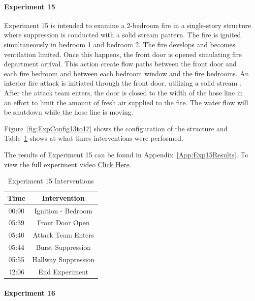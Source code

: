 \documentclass[12pt,oneside]{book}
\begin{document}
\clearpage

\paragraph{Experiment 15} \mbox{}

Experiment 15 is intended to examine a 2-bedroom fire in a single-story structure where suppression is conducted with a solid stream pattern. The fire is ignited simultaneously in bedroom 1 and bedroom 2. The fire develops and becomes ventilation limited. Once this happens, the front door is opened simulating fire department arrival. This action create flow paths between the front door and each fire bedroom and between each bedroom window and the fire bedrooms. An interior fire attack is initiated through the front door, utilizing a solid stream . After the attack team enters, the door is closed to the width of the hose line in an effort to limit the amount of fresh air supplied to the fire. The water flow will be shutdown while the hose line is moving.

Figure~\ref{fig:ExpConfig13to17} shows the configuration of the structure and Table~\ref{Table:Exp15Interventions} shows at what times interventions were performed. 

The results of Experiment 15 can be found in Appendix~\ref{App:Exp15Results}. To view the full experiment video \href{https://youtu.be/gl8rc1Nsl1k}{Click Here}.

\begin{table}[H]
	\centering
	\caption{Experiment 15 Interventions}
	\begin{tabular}{|c|c|} 
		\hline
		Time & Intervention \\ \hline \hline
		00:00 & Ignition - Bedroom \\ \hline
		05:39 & Front Door Open \\ \hline
		05:40 & Attack Team Enters\\ \hline
		05:44 & Burst Suppression \\ \hline 
		05:55 & Hallway Suppression \\ \hline
		12:06 & End Experiment\\ \hline
	\end{tabular}
	\label{Table:Exp15Interventions}
\end{table}

\clearpage

\paragraph{Experiment 16} \mbox{}
\end{document}
